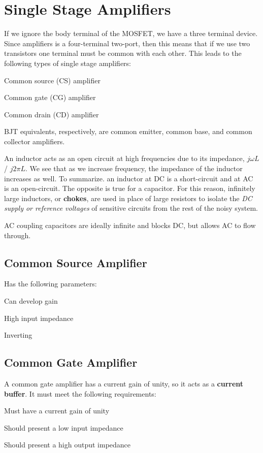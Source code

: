 \chapter{Single Stage Amplifiers}
If we ignore the body terminal of the MOSFET, we have a three terminal device. Since amplifiers is a four-terminal two-port, then this means that if we use two transistors one terminal must be common with each other. This leads to the following types of single stage amplifiers:
\begin{pline}
    \item Common source (CS) amplifier
    \item Common gate (CG) amplifier 
    \item Common drain (CD) amplifier
\end{pline}
BJT equivalents, respectively, are common emitter, common base, and common collector amplifiers. 

An inductor acts as an open circuit at high frequencies due to its impedance, $j \omega L$ / $j 2 \pi L$. We see that as we increase frequency, the impedance of the inductor increases as well. To summarize. an inductor at DC is a short-circuit and at AC is an open-circuit. The opposite is true for a capacitor. For this reason, infinitely large inductors, or \textbf{chokes}, are used in place of large resistors to isolate the \textit{DC supply or reference voltages} of sensitive circuits from the rest of the noisy system. 

AC coupling capacitors are ideally infinite and blocks DC, but allows AC to flow through.

\section{Common Source Amplifier}
Has the following parameters:
\begin{pline}
    \item Can develop gain
    \item High input impedance
    \item Inverting
\end{pline}

\section{Common Gate Amplifier}
A common gate amplifier has a current gain of unity, so it acts as a \textbf{current buffer}. It must meet the following requirements:
\begin{pline}
    \item Must have a current gain of unity
    \item Should present a low input impedance
    \item Should present a high output impedance
\end{pline}

